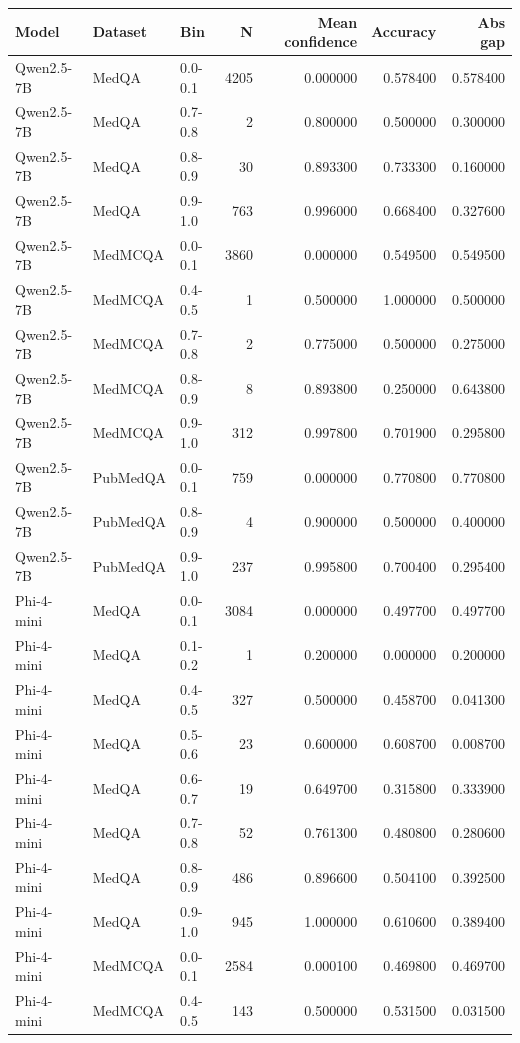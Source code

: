 \begin{tabular}{lllrrrr}
\toprule
Model & Dataset & Bin & N & Mean confidence & Accuracy & Abs gap \\
\midrule
Qwen2.5-7B & MedQA & 0.0-0.1 & 4205 & 0.000000 & 0.578400 & 0.578400 \\
Qwen2.5-7B & MedQA & 0.7-0.8 & 2 & 0.800000 & 0.500000 & 0.300000 \\
Qwen2.5-7B & MedQA & 0.8-0.9 & 30 & 0.893300 & 0.733300 & 0.160000 \\
Qwen2.5-7B & MedQA & 0.9-1.0 & 763 & 0.996000 & 0.668400 & 0.327600 \\
Qwen2.5-7B & MedMCQA & 0.0-0.1 & 3860 & 0.000000 & 0.549500 & 0.549500 \\
Qwen2.5-7B & MedMCQA & 0.4-0.5 & 1 & 0.500000 & 1.000000 & 0.500000 \\
Qwen2.5-7B & MedMCQA & 0.7-0.8 & 2 & 0.775000 & 0.500000 & 0.275000 \\
Qwen2.5-7B & MedMCQA & 0.8-0.9 & 8 & 0.893800 & 0.250000 & 0.643800 \\
Qwen2.5-7B & MedMCQA & 0.9-1.0 & 312 & 0.997800 & 0.701900 & 0.295800 \\
Qwen2.5-7B & PubMedQA & 0.0-0.1 & 759 & 0.000000 & 0.770800 & 0.770800 \\
Qwen2.5-7B & PubMedQA & 0.8-0.9 & 4 & 0.900000 & 0.500000 & 0.400000 \\
Qwen2.5-7B & PubMedQA & 0.9-1.0 & 237 & 0.995800 & 0.700400 & 0.295400 \\
Phi-4-mini & MedQA & 0.0-0.1 & 3084 & 0.000000 & 0.497700 & 0.497700 \\
Phi-4-mini & MedQA & 0.1-0.2 & 1 & 0.200000 & 0.000000 & 0.200000 \\
Phi-4-mini & MedQA & 0.4-0.5 & 327 & 0.500000 & 0.458700 & 0.041300 \\
Phi-4-mini & MedQA & 0.5-0.6 & 23 & 0.600000 & 0.608700 & 0.008700 \\
Phi-4-mini & MedQA & 0.6-0.7 & 19 & 0.649700 & 0.315800 & 0.333900 \\
Phi-4-mini & MedQA & 0.7-0.8 & 52 & 0.761300 & 0.480800 & 0.280600 \\
Phi-4-mini & MedQA & 0.8-0.9 & 486 & 0.896600 & 0.504100 & 0.392500 \\
Phi-4-mini & MedQA & 0.9-1.0 & 945 & 1.000000 & 0.610600 & 0.389400 \\
Phi-4-mini & MedMCQA & 0.0-0.1 & 2584 & 0.000100 & 0.469800 & 0.469700 \\
Phi-4-mini & MedMCQA & 0.4-0.5 & 143 & 0.500000 & 0.531500 & 0.031500 \\

\end{tabular}
